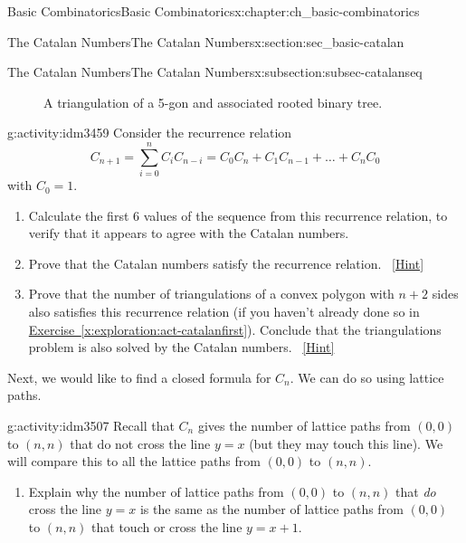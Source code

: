 \documentclass[oneside,10pt,]{book}
\numberwithin{equation}{chapter}
\newcommand{\vtx}[2]{node[fill,circle,inner sep=0pt, minimum size=4pt,label=#1:#2]{}}
\newcommand{\va}[1]{\vtx{above}{#1}}
\renewcommand{\v}{\vtx{above}{}}
\begin{document}
\begin{chapterptx}{Basic Combinatorics}{}{Basic Combinatorics}{}{}{x:chapter:ch_basic-combinatorics}
\begin{sectionptx}{The Catalan Numbers}{}{The Catalan Numbers}{}{}{x:section:sec_basic-catalan}
\begin{subsectionptx}{The Catalan Numbers}{}{The Catalan Numbers}{}{}{x:subsection:subsec-catalanseq}
\begin{figure}
\begin{sidebyside}{2}{0.125}{0.125}{0.25}
\begin{sbspanel}{0.25}
        \end{sbspanel}%
\end{sidebyside}%
\caption{A triangulation of a 5-gon and associated rooted binary tree.\label{x:figure:fig-triangulationtree}}
\end{figure}
\begin{activity}{}{g:activity:idm3459}%
Consider the recurrence relation%
\begin{equation*}
C_{n + 1} = \sum_{i = 0}^n C_iC_{n-i} = C_{0}C_{n} + C_{1}C_{n - 1} + \ldots + C_{n}C_{0}
\end{equation*}
with \(C_0 = 1\).%
\begin{enumerate}[font=\bfseries,label=(\alph*),ref=\alph*]
\item{}Calculate the first 6 values of the sequence from this recurrence relation, to verify that it appears to agree with the Catalan numbers.%
\item{}Prove that the Catalan numbers satisfy the recurrence relation.%
\qquad~\hfill{\tiny\hyperlink{g:hint:idm3472-back}{[Hint]}}\item{}Prove that the number of triangulations of a convex polygon with \(n+2\) sides also satisfies this recurrence relation (if you haven't already done so in \hyperref[x:exploration:act-catalanfirst]{Exercise~\ref{x:exploration:act-catalanfirst}}).  Conclude that the triangulations problem is also solved by the Catalan numbers.%
\qquad~\hfill{\tiny\hyperlink{g:hint:idm3497-back}{[Hint]}}\end{enumerate}
\end{activity}
Next, we would like to find a closed formula for \(C_n\).  We can do so using lattice paths.%
\begin{activity}{}{g:activity:idm3507}%
Recall that \(C_n\) gives the number of lattice paths from \((0,0)\) to \((n,n)\) that do not cross the line \(y = x\) (but they may touch this line).  We will compare this to all the lattice paths from \((0,0)\) to \((n,n)\).%
\begin{enumerate}[font=\bfseries,label=(\alph*),ref=\alph*]
\item{}Explain why the number of lattice paths from \((0,0)\) to \((n,n)\) that \emph{do} cross the line \(y = x\) is the same as the number of lattice paths from \((0,0)\) to \((n,n)\) that touch or cross the line \(y = x + 1\).%

\end{enumerate}
\end{activity}
\end{subsectionptx}
\end{sectionptx}
\end{chapterptx}
\end{document}
